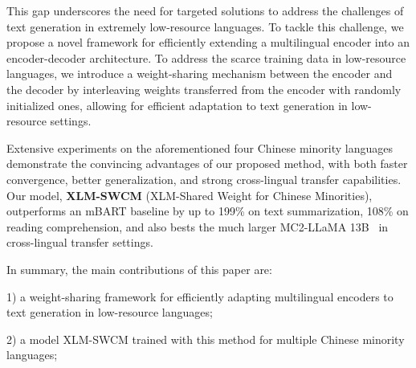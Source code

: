 This gap underscores the need for targeted solutions to address the challenges of text generation in extremely low-resource languages. To tackle this challenge, we propose a novel framework for efficiently extending a multilingual encoder into an encoder-decoder architecture. To address the scarce training data in low-resource languages, we introduce a weight-sharing mechanism between the encoder and the decoder by interleaving weights transferred from the encoder with randomly initialized ones, allowing for efficient adaptation to text generation in low-resource settings.


Extensive experiments on the aforementioned four Chinese minority languages demonstrate the convincing advantages of our proposed method, with both faster convergence, better generalization, and strong cross-lingual transfer capabilities. Our model, \textbf{XLM-SWCM} (XLM-Shared Weight for Chinese Minorities), outperforms an mBART baseline by up to 199\% on text summarization, 108\% on reading comprehension, and also bests the much larger MC2-LLaMA 13B~\citep{mc2} in cross-lingual transfer settings.

In summary, the main contributions of this paper are:

1) a weight-sharing framework for efficiently adapting multilingual encoders to text generation in low-resource languages;

2) a model XLM-SWCM trained with this method for multiple Chinese minority languages;

